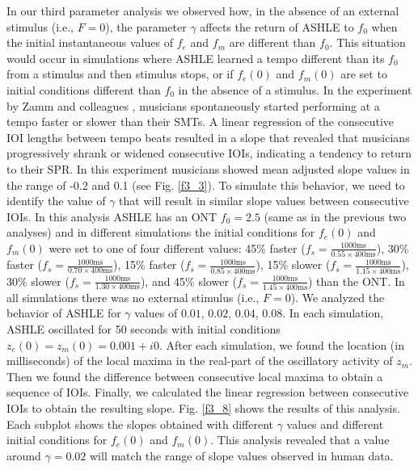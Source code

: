 \documentclass{report}
\begin{document}
In our third parameter analysis we observed how, in the absence of an external stimulus (i.e., $F = 0$), the parameter $\gamma$ affects the return of ASHLE to $f_0$ when the initial instantaneous values of $f_e$ and $f_m$ are different than $f_0$. This situation would occur in simulations where ASHLE learned a tempo different than its $f_0$ from a stimulus and then stimulus stops, or if $f_e(0)$ and $f_m(0)$ are set to initial conditions different than $f_0$ in the absence of a stimulus. In the experiment by Zamm and colleagues \cite{zamm2018musicians}, musicians spontaneously started performing at a tempo faster or slower than their SMTs. A linear regression of the consecutive IOI lengths between tempo beats resulted in a slope that revealed that musicians progressively shrank or widened consecutive IOIs, indicating a tendency to return to their SPR. In this experiment musicians showed mean adjusted slope values in the range of -0.2 and 0.1 (see Fig.{} \ref{f3_3}). To simulate this behavior, we need to identify the value of $\gamma$ that will result in similar slope values between consecutive IOIs. In this analysis ASHLE has an ONT $f_0= 2.5$ (same as in the previous two analyses) and in different simulations the initial conditions for $f_e(0)$ and $f_m(0)$ were set to one of four different values: 45\% faster ($f_s = \frac{1000\text{ms}}{0.55 \times 400\text{ms}}$), 30\% faster ($f_s = \frac{1000\text{ms}}{0.70 \times 400\text{ms}}$), 15\% faster ($f_s = \frac{1000\text{ms}}{0.85 \times 400\text{ms}}$), 15\% slower ($f_s = \frac{1000\text{ms}}{1.15 \times 400\text{ms}}$), 30\% slower ($f_s = \frac{1000\text{ms}}{1.30 \times 400\text{ms}}$), and 45\% slower ($f_s = \frac{1000\text{ms}}{1.45 \times 400\text{ms}}$) than the ONT. In all simulations there was no external stimulus (i.e., $F = 0$). We analyzed the behavior of ASHLE for $\gamma$ values of $0.01$, $0.02$, $0.04$, $0.08$. In each simulation, ASHLE oscillated for 50 seconds with initial conditions $z_e(0)=z_m(0)=0.001 + i0$. After each simulation, we found the location (in milliseconds) of the local maxima in the real-part of the oscillatory activity of $z_m$. Then we found the difference between consecutive local maxima to obtain a sequence of IOIs. Finally, we calculated the linear regression between consecutive IOIs to obtain the resulting slope. Fig.{} \ref{f3_8} shows the results of this analysis. Each subplot shows the slopes obtained with different $\gamma$ values and different initial conditions for $f_e(0)$ and $f_m(0)$. This analysis revealed that a value around $\gamma= 0.02$ will match the range of slope values observed in human data.
\end{document}
